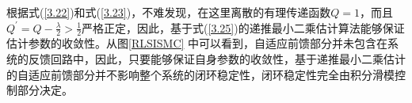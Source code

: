 根据式(\ref{3.22})和式(\ref{3.23})，不难发现，在这里离散的有理传递函数$Q=1$，而且$Q^{'}=Q-\frac{\lambda}{2}>\frac{1}{2}$严格正定，因此，基于式(\ref{3.25})的递推最小二乘估计算法能够保证估计参数的收敛性。从图\ref{RLSISMC}
中可以看到，自适应前馈部分并未包含在系统的反馈回路中，因此，只要能够保证自身参数的收敛性，基于递推最小二乘估计的自适应前馈部分并不影响整个系统的闭环稳定性，闭环稳定性完全由积分滑模控制部分决定。

